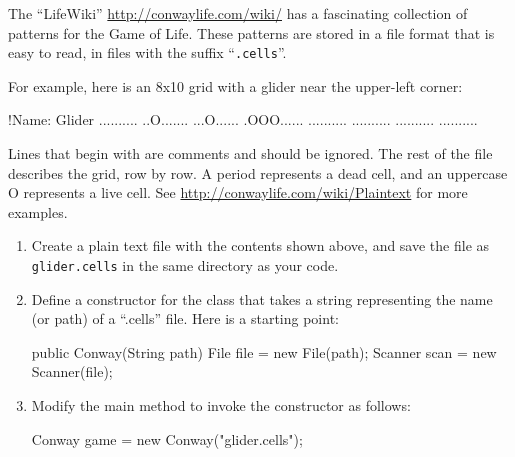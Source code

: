 \begin{exercise}


The ``LifeWiki'' \url{http://conwaylife.com/wiki/} has a fascinating collection of patterns for the Game of Life.
These patterns are stored in a file format that is easy to read, in files with the suffix ``\verb|.cells|''.

For example, here is an 8x10 grid with a glider near the upper-left corner:

\begin{stdout}
!Name: Glider
..........
..O.......
...O......
.OOO......
..........
..........
..........
..........
\end{stdout}

Lines that begin with \java{!} are comments and should be ignored.
The rest of the file describes the grid, row by row.
A period represents a dead cell, and an uppercase O represents a live cell.
See \url{http://conwaylife.com/wiki/Plaintext} for more examples.

\begin{enumerate}

\item Create a plain text file with the contents shown above, and save the file as \verb|glider.cells| in the same directory as your code.


\item Define a constructor for the  class that takes a string representing the name (or path) of a ``.cells'' file.
Here is a starting point:

\begin{code}
public Conway(String path) {
    File file = new File(path);
    Scanner scan = new Scanner(file);
}
\end{code}

\item Modify the main method to invoke the constructor as follows:

\begin{code}
Conway game = new Conway("glider.cells");
\end{code}


\end{enumerate}
\end{exercise}

